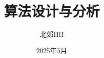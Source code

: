 \documentclass{article}
\begin{document}
\pagestyle{empty}
\title{算法设计与分析}
\author{北郊HH}
\date{2025年5月}
\maketitle
\thispagestyle{empty}
\tableofcontents
\newpage

\pagestyle{fancy}

\setcounter{page}{1}












\end{document}
